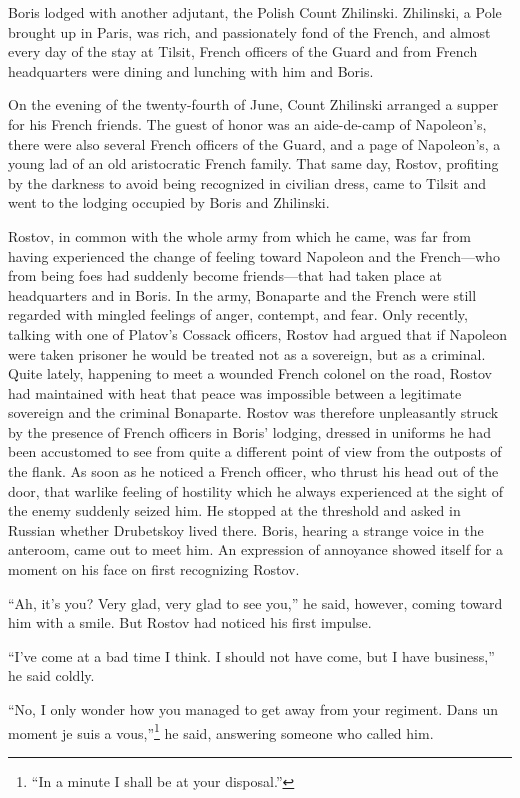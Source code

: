 Boris lodged with another adjutant, the Polish Count Zhilinski.
Zhilinski, a Pole brought up in Paris, was rich, and passionately
fond of the French, and almost every day of the stay at Tilsit,
French officers of the Guard and from French headquarters were
dining and lunching with him and Boris.

On the evening of the twenty-fourth of June, Count Zhilinski
arranged a supper for his French friends. The guest of honor was
an aide-de-camp of Napoleon's, there were also several French
officers of the Guard, and a page of Napoleon's, a young lad of
an old aristocratic French family.  That same day, Rostov,
profiting by the darkness to avoid being recognized in civilian
dress, came to Tilsit and went to the lodging occupied by Boris
and Zhilinski.

Rostov, in common with the whole army from which he came, was far
from having experienced the change of feeling toward Napoleon and
the French---who from being foes had suddenly become
friends---that had taken place at headquarters and in Boris. In
the army, Bonaparte and the French were still regarded with
mingled feelings of anger, contempt, and fear. Only recently,
talking with one of Platov's Cossack officers, Rostov had argued
that if Napoleon were taken prisoner he would be treated not as a
sovereign, but as a criminal. Quite lately, happening to meet a
wounded French colonel on the road, Rostov had maintained with
heat that peace was impossible between a legitimate sovereign and
the criminal Bonaparte. Rostov was therefore unpleasantly struck
by the presence of French officers in Boris' lodging, dressed in
uniforms he had been accustomed to see from quite a different
point of view from the outposts of the flank. As soon as he
noticed a French officer, who thrust his head out of the door,
that warlike feeling of hostility which he always experienced at
the sight of the enemy suddenly seized him. He stopped at the
threshold and asked in Russian whether Drubetskoy lived there.
Boris, hearing a strange voice in the anteroom, came out to meet
him. An expression of annoyance showed itself for a moment on his
face on first recognizing Rostov.

``Ah, it's you? Very glad, very glad to see you,'' he said,
however, coming toward him with a smile. But Rostov had noticed
his first impulse.

``I've come at a bad time I think. I should not have come, but I
have business,'' he said coldly.

``No, I only wonder how you managed to get away from your
regiment. Dans un moment je suis a vous,''\footnote{``In a minute
I shall be at your disposal.''} he said, answering someone who
called him.

